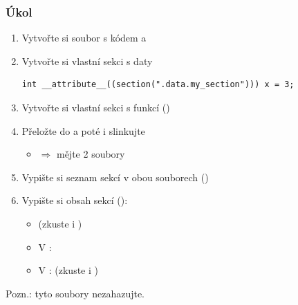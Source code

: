 \begin{frame}[fragile]
  \frametitle{Úkol}

  \begin{enumerate}
    \item Vytvořte si soubor s kódem  a 
    \item Vytvořte si vlastní sekci s daty
    \begin{lstlisting}[belowskip=0pt]
int __attribute__((section(".data.my_section"))) x = 3;
    \end{lstlisting}
    \item Vytvořte si vlastní sekci s funkcí ()
    \item Přeložte do  a poté i slinkujte
    \begin{itemize}
      \item $\Rightarrow$ mějte 2 soubory
    \end{itemize}

    \item Vypište si seznam sekcí v obou souborech ()
    \item Vypište si obsah sekcí ():
    \begin{itemize}
      \item {} (zkuste i )
      \item V : 
      \item V :  (zkuste i )
    \end{itemize}
  \end{enumerate}

  \medskip

  Pozn.: tyto soubory nezahazujte.

\end{frame}

